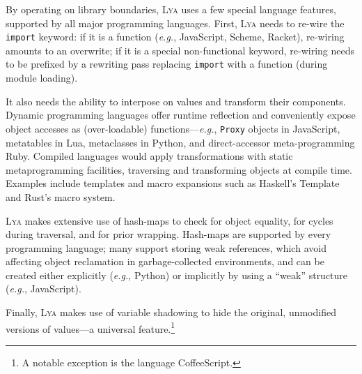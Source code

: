 \documentclass[letterpaper,twocolumn,10pt]{article}
\def\eg{{\em e.g.}, }
\def\ie{{\em i.e.}, }
\newcommand{\ttt}[1]{\texttt{#1}}
\newcommand{\sys}{{\scshape Lya}\xspace}
\begin{document}
By operating on library boundaries, \sys uses a few special language features, supported by all major programming languages.
First, \sys needs to re-wire the \ttt{import} keyword:
  if it is a function (\eg JavaScript, Scheme, Racket), re-wiring amounts to an overwrite;
  if it is a special non-functional keyword, re-wiring needs to be prefixed by a rewriting pass replacing \ttt{import} with a function (during module loading).

It also needs the ability to interpose on values and transform their components.
Dynamic programming languages offer runtime reflection and conveniently expose object accesses as (over-loadable) functions---\eg \ttt{Proxy} objects in JavaScript, metatables in Lua, metaclasses in Python, and direct-accessor meta-programming Ruby.
Compiled languages would apply transformations with static metaprogramming facilities, traversing and transforming objects at compile time.
Examples include templates and macro expansions such as Haskell's Template and Rust's macro system.

\sys makes extensive use of hash-maps to check for object equality, for cycles during traversal, and for prior wrapping.
Hash-maps are supported by every programming language; many support storing weak references, which avoid affecting object reclamation in garbage-collected environments, and can be created either explicitly (\eg Python) or implicitly by using a ``weak'' structure (\eg JavaScript).

Finally, \sys makes use of variable shadowing to hide the original, unmodified versions of values---a universal feature.\footnote{
  A notable exception is the language CoffeeScript. %
}
\end{document}
